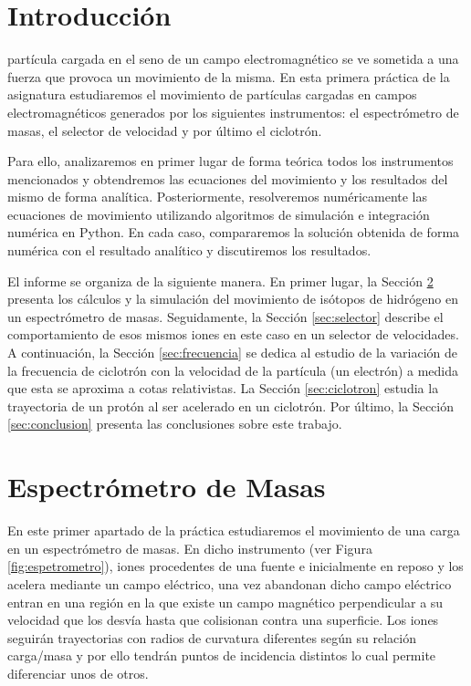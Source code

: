 \documentclass[journal]{IEEEtran}
\begin{document}
\section{Introducción}

 partícula cargada en el seno de un campo electromagnético se ve sometida a una fuerza que provoca un movimiento de la misma. En esta primera práctica de la asignatura estudiaremos el movimiento de partículas cargadas en campos electromagnéticos generados por los siguientes instrumentos: el espectrómetro de masas, el selector de velocidad y por último el ciclotrón.

Para ello, analizaremos en primer lugar de forma teórica todos los instrumentos mencionados y obtendremos las ecuaciones del movimiento y los resultados del mismo de forma analítica. Posteriormente, resolveremos numéricamente las ecuaciones de movimiento utilizando algoritmos de simulación e integración numérica en Python. En cada caso, compararemos la solución obtenida de forma numérica con el resultado analítico y discutiremos los resultados.

El informe se organiza de la siguiente manera. En primer lugar, la Sección \ref{sec:espectrometro} presenta los cálculos y la simulación del movimiento de isótopos de hidrógeno en un espectrómetro de masas. Seguidamente, la Sección \ref{sec:selector} describe el comportamiento de esos mismos iones en este caso en un selector de velocidades. A continuación, la Sección \ref{sec:frecuencia} se dedica al estudio de la variación de la frecuencia de ciclotrón con la velocidad de la partícula (un electrón) a medida que esta se aproxima a cotas relativistas. La Sección \ref{sec:ciclotron} estudia la trayectoria de un protón al ser acelerado en un ciclotrón. Por último, la Sección \ref{sec:conclusion} presenta las conclusiones sobre este trabajo.

\newpage

\section{Espectrómetro de Masas}
\label{sec:espectrometro}

En este primer apartado de la práctica estudiaremos el movimiento de una carga en un espectrómetro de masas. En dicho instrumento (ver Figura \ref{fig:espetrometro}), iones procedentes de una fuente e inicialmente en reposo y los acelera mediante un campo eléctrico, una vez abandonan dicho campo eléctrico entran en una región en la que existe un campo magnético perpendicular a su velocidad que los desvía hasta que colisionan contra una superficie. Los iones seguirán trayectorias con radios de curvatura diferentes según su relación carga/masa y por ello tendrán puntos de incidencia distintos lo cual permite diferenciar unos de otros.
\end{document}
